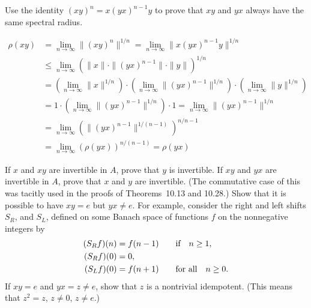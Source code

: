 \begin{enumerate}

\begin{excopy}
Use the identity \((xy)^n = x(yx)^{n-1}y\) to prove that \(xy\) and \(yx\)
always have the same spectral radius.
\end{excopy}

\begin{align*}
 \rho(xy) &= \lim_{n\to\infty} \|(xy)^n\|^{1/n} = \lim_{n\to\infty}\|x(yx)^{n-1}y\|^{1/n} \\
  &\leq \lim_{n\to\infty} \left(\|x\|\cdot \|(yx)^{n-1}\|\cdot \|y\|\right)^{1/n} \\
  &= \left(\lim_{n\to\infty} \|x\|^{1/n}\right)
     \cdot
     \left(\lim_{n\to\infty} \|(yx)^{n-1}\|^{1/n}\right)
     \cdot
     \left(\lim_{n\to\infty} \|y\|^{1/n}\right) \\
  &= 1 \cdot \left(\lim_{n\to\infty} \|(yx)^{n-1}\|^{1/n}\right) \cdot 1
   = \lim_{n\to\infty} \|(yx)^{n-1}\|^{1/n} \\
  &= \lim_{n\to\infty} \left(\|(yx)^{n-1}\|^{1/(n-1)}\right)^{n/n-1} \\
  &= \lim_{n\to\infty} \left(\rho(yx)\right)^{n/(n-1)} = \rho(yx)
\end{align*}

\begin{excopy}
\begin{itemize}
    If $x$ and \(xy\) are invertible in $A$, prove that $y$ is invertible.
    If \(xy\) and \(yx\) are invertible in $A$,
    prove that $x$ and $y$ are invertible. (The
    commutative case of this was tacitly used in the proofs of Theorems~10.13
    and 10.28.)
    Show that it is possible to have \(xy = e\) but \(yx \neq e\).
    For example, consider the
    right and left shifts \(S_R\), and \(S_L\),
    defined on some Banach space of functions $f$
    on the nonnegative integers by
    \begin{align*}
     (S_R f)(n) &= f(n - 1) \qquad \textnormal{if}\quad n \geq 1,\\
     (S_R f)(0) &= 0, \\
     (S_L f)(0) &= f(n + 1) \qquad \textnormal{for all}\quad n \geq 0.
    \end{align*}
    If \(xy = e\) and \(yx = z \neq e\),
    show that $z$ is a nontrivial idempotent. (This
    means that \(z^2 = z\), \(z \neq 0\), \(z \neq e\).)
\end{itemize}
\end{excopy}


\end{enumerate}
